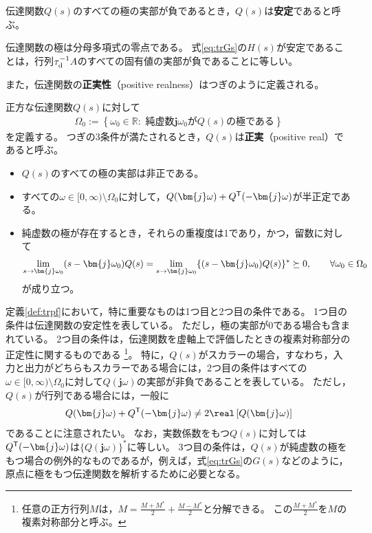 \documentclass[tombow,dvipdfmx]{corona-a5-1.1}
\begin{document}
\begin{定義}[伝達関数の安定性]\label{def:trsta}
伝達関数$Q(s)$のすべての極の実部が負であるとき，$Q(s)$は\textbf{安定}であると呼ぶ。
\end{定義}

伝達関数の極は分母多項式の零点である。
式\ref{eq:trGs}の$H(s)$が安定であることは，行列$\tau_{\rm d}^{-1}A$のすべての固有値の実部が負であることに等しい。

また，伝達関数の\textbf{正実性}（positive realness）はつぎのように定義される。

\begin{定義}[伝達関数の正実性]\label{def:trpf}
正方な伝達関数$Q(s)$に対して
\begin{align}\label{eq:defOm0}
\Omega_0 := \left\{
\omega_0 \in \mathbb{R}: 
\mbox{ 純虚数$\bm{j} \omega_0$が$Q(s)$の極である}
\right\}
\end{align}
を定義する。
つぎの3条件が満たされるとき，$Q(s)$は\textbf{正実}（positive real）であると呼ぶ。
\begin{itemize}
\item $Q(s)$のすべての極の実部は非正である。
\item すべての$\omega \in [0,\infty)\setminus \Omega_0$に対して，$Q(\bm{j} \omega) + Q^{\sf T}(-\bm{j} \omega)$が半正定である。
\item 純虚数の極が存在するとき，それらの重複度は1であり，かつ，留数に対して
\begin{align*}
\lim_{s \rightarrow \bm{j} \omega_0} (s-\bm{j} \omega_0) Q(s) = \lim_{s\rightarrow \bm{j} \omega_0} \{ (s-\bm{j} \omega_0) Q(s)\}^{\sf *}\succeq 0
,\qquad
\forall \omega_0 \in \Omega_0
\end{align*}
が成り立つ。
\end{itemize}
\end{定義}

定義\ref{def:trpf}において，特に重要なものは1つ目と2つ目の条件である。
1つ目の条件は伝達関数の安定性を表している。
ただし，極の実部が0である場合も含まれている。
2つ目の条件は，伝達関数を虚軸上で評価したときの複素対称部分の正定性に関するものである
\footnote{
任意の正方行列$M$は，$M=\frac{M+M^*}{2}+\frac{M-M^*}{2}$と分解できる。
この$\frac{M+M^*}{2}$を$M$の複素対称部分と呼ぶ。
}。
特に，$Q(s)$がスカラーの場合，すなわち，入力と出力がどちらもスカラーである場合には，2つ目の条件はすべての$\omega \in [0,\infty)\setminus \Omega_0$に対して$Q(\bm{j}\omega)$の実部が非負であることを表している。
ただし，$Q(s)$が行列である場合には，一般に
\begin{align*}
Q(\bm{j} \omega) + Q^{\sf T}(-\bm{j} \omega) \neq 2 \real\left[ Q(\bm{j} \omega) \right]
\end{align*}
であることに注意されたい。
なお，実数係数をもつ$Q(s)$に対しては$Q^{\sf T}( -\bm{j} \omega)$は$\{Q(\bm{j} \omega)\}^*$に等しい。
3つ目の条件は，$Q(s)$が純虚数の極をもつ場合の例外的なものであるが，例えば，式\ref{eq:trGs}の$G(s)$などのように，原点に極をもつ伝達関数を解析するために必要となる。
\end{document}
